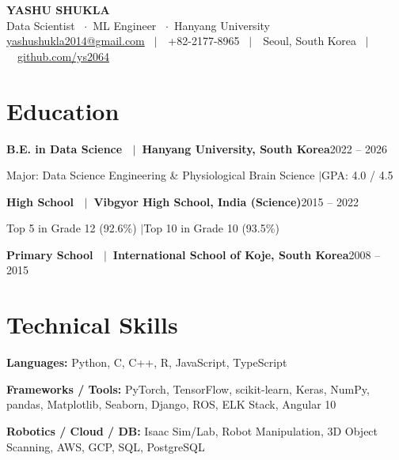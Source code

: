 \documentclass[10pt]{article}
\newcommand{\entry}[2]{\textbf{#1}\hfill{\color{muted}#2}\par}
\begin{document}
\begin{center}
    {\Huge\bfseries\color{accent} YASHU SHUKLA}\\[2pt]
    {\normalsize Data Scientist \ $\cdot$\ ML Engineer \ $\cdot$\ Hanyang University}\\[2pt]
    {\small
    \href{mailto:yashushukla2014@gmail.com}{yashushukla2014@gmail.com} \ $\vert$\ \ +82-2177-8965 \ $\vert$\ \ Seoul, South Korea \ $\vert$\ \ \href{https://github.com/ys2064}{github.com/ys2064}}
\end{center}

\vspace{-4pt}

\section{Education}
\entry{B.E. in Data Science \ $\vert$\ Hanyang University, South Korea}{2022 -- 2026}
Major: Data Science Engineering \& Physiological Brain Science \quad$\vert$\quad GPA: 4.0 / 4.5\par
\vspace{1pt}
\entry{High School \ $\vert$\ Vibgyor High School, India (Science)}{2015 -- 2022}
Top 5 in Grade 12 (92.6\%) \quad$\vert$\quad Top 10 in Grade 10 (93.5\%)\par
\vspace{1pt}
\entry{Primary School \ $\vert$\ International School of Koje, South Korea}{2008 -- 2015}

\section{Technical Skills}
\textbf{Languages:} Python, C, C++, R, JavaScript, TypeScript\par
\textbf{Frameworks / Tools:} PyTorch, TensorFlow, scikit-learn, Keras, NumPy, pandas, Matplotlib, Seaborn, Django, ROS, ELK Stack, Angular 10\par
\textbf{Robotics / Cloud / DB:} Isaac Sim/Lab, Robot Manipulation, 3D Object Scanning, AWS, GCP, SQL, PostgreSQL\par

\end{document}
